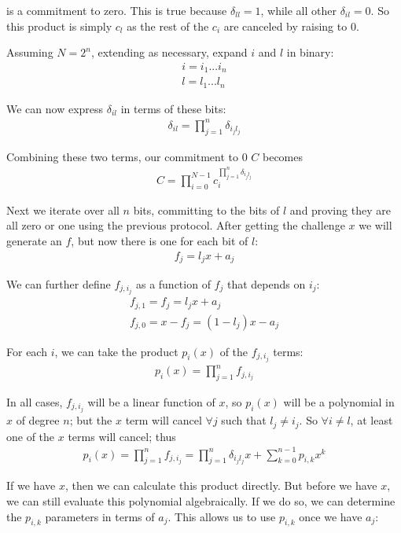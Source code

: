 \documentclass{article}
\begin{document}
is a commitment to zero.  This is true because $\delta_{ll} = 1$, while all other $\delta_{il} = 0$. So this product is simply $c_l$ as the rest of the $c_i$ are canceled by raising to $0$.

Assuming $N = 2^n$, extending as necessary, expand $i$ and $l$ in binary:
\begin{align}
  i = i_1...i_n\\
  l = l_1...l_n
\end{align}

We can now express $\delta_{il}$ in terms of these bits:
\begin{align}
  \delta_{il} = \prod_{j=1}^{n} \delta_{i_jl_j}
\end{align}
  
Combining these two terms, our commitment to $0$ $C$ becomes
\begin{align}
  C = \prod_{i=0}^{N-1}c_i^{\prod_{j=1}^{n} \delta_{i_jl_j}}
\end{align}

Next we iterate over all $n$ bits, committing to the bits of $l$ and proving they are all zero or one using the previous protocol.  After getting the challenge $x$ we will generate an $f$, but now there is one for each bit of $l$:
\begin{align}
  f_j = l_j x + a_j
\end{align}

We can further define $f_{j, i_j}$ as a function of $f_j$ that depends on $i_j$:
\begin{align}
  f_{j,1} = f_j = l_j x + a_j\\
  f_{j,0} = x - f_j = (1 - l_j) x - a_j
\end{align}

For each $i$, we can take the product $p_i(x)$ of the $f_{j, i_j}$ terms:
\begin{align}
  p_i(x) = \prod_{j=1}^{n} f_{j, i_j}
\end{align}

In all cases, $f_{j, i_j}$ will be a linear function of $x$, so $p_i(x)$ will be a polynomial in $x$ of degree $n$; but the $x$ term will cancel $\forall j$ such that $l_j \ne i_j$.  So $\forall i \ne l$, at least one of the $x$ terms will cancel; thus
\begin{align}
  p_i(x) = \prod_{j=1}^n f_{j,i_j} = {\prod_{j=1}^{n}\delta_{i_jl_j} x} + \sum_{k=0}^{n-1}{p_{i,k} x^k}
\end{align}

If we have $x$, then we can calculate this product directly.  But before we have $x$, we can still evaluate this polynomial algebraically.  If we do so, we can determine the $p_{i,k}$ parameters in terms of $a_j$.  This allows us to use $p_{i,k}$ once we have $a_j$:
\end{document}
